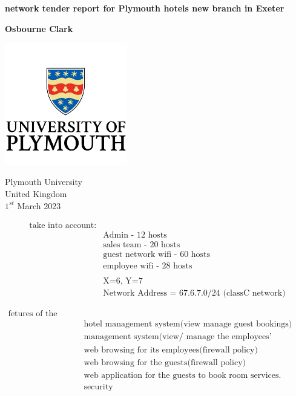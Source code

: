 \documentclass[11pt]{article}
\begin{document}
\begin{titlepage}
  \begin{center}
    \huge
    \textbf{ network tender report for Plymouth hotels new branch in Exeter }
    
    \vspace{1.5cm}
    \LARGE
    \textbf{Osbourne Clark}
    
    \vspace{1.5cm}
    \vspace{1.0cm}
        
    \includegraphics[width=0.4\textwidth]{./plymouthUniLogo}

    \Large
    Plymouth University\\
    United Kingdom\\
    $1^{st}$ March 2023
    
    
    
  \end{center}
\end{titlepage}

\tableofcontents



\begin{align*}
\text{take into account:}&\\
	&\text{Admin - 12 hosts}\\
	&\text{sales team - 20 hosts}\\
	&\text{guest network wifi - 60 hosts}\\
	&\text{employee wifi - 28 hosts}\\
	&\\
	&\text{X=6, Y=7}\\
	&\text{Network Address = 67.6.7.0/24 (classC network)}
 \end{align*}

\begin{align*}
\text{fetures of the network:}&\\
	&\text{hotel management system(view manage guest bookings)(server)}\\
	&\text{management system(view/ manage the employees’ information)(server)}\\
	&\text{web browsing for its employees(firewall policy)}\\
	&\text{web browsing for the guests(firewall policy)}\\
	&\text{web application for the guests to book room services. (server)(firewall policy)}\\
	&\text{security}
 \end{align*}
\end{document}
